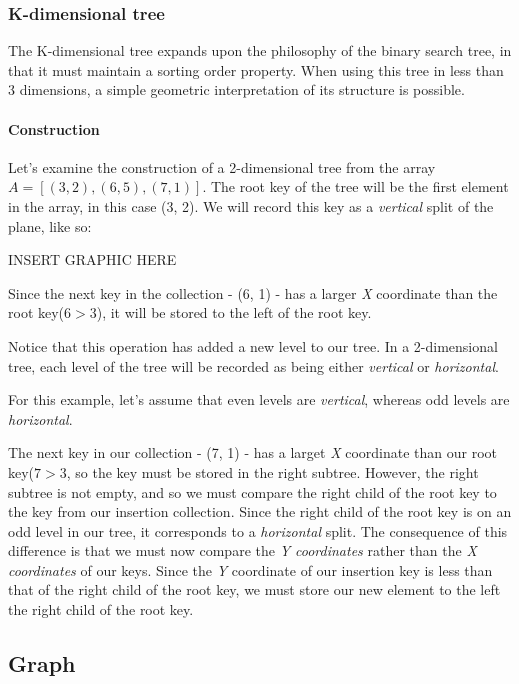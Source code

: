 \documentclass{article}
\begin{document}
\subsubsection{K-dimensional tree}
The K-dimensional tree expands upon the philosophy of the binary search tree, in that it
must maintain a sorting order property. When using this tree in less than 3 dimensions,
a simple geometric interpretation of its structure is possible.

\paragraph{Construction}
Let's examine the construction of a 2-dimensional tree from the array \(A = [(3, 2), (6, 5), (7, 1)]\).
The root key of the tree will be the first element in the array, in this case (3, 2).
We will record this key as a {\em vertical} split of the plane, like so:

{\huge INSERT GRAPHIC HERE}

Since the next key in the collection - (6, 1) - has a larger {\em X} coordinate than the root key(\(6 > 3\)), it will be stored to the left of the root key.

Notice that this operation has added a new level to our tree. In a 2-dimensional tree, each level of the tree will be recorded as being either {\em vertical} or {\em horizontal}.

For this example, let's assume that even levels are {\em vertical}, whereas odd levels are {\em horizontal}.

The next key in our collection - (7, 1) - has a larget {\em X} coordinate than our root key(\(7 > 3\), so the key must be stored in the right subtree. However, the right subtree is not empty, and so we must compare the right child of the root key to the key from our insertion collection. Since the right child of the root key is on an odd level in our tree, it corresponds to a {\em horizontal} split. The consequence of this difference is that we must now compare the {\em Y coordinates} rather than the {\em X coordinates} of our keys. Since the {\em Y} coordinate of our insertion key is less than that of the right child of the root key, we must store our new element to the left the right child of the root key.

\newpage

\subsection{Graph}
\end{document}
